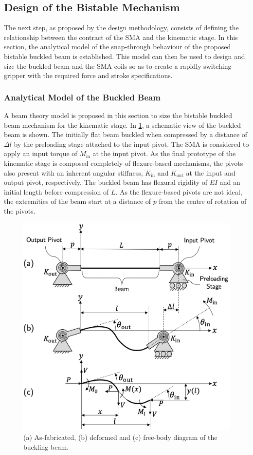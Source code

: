 \subsection{Design of the Bistable Mechanism}
The next step, as proposed by the design methodology, consists of defining the relationship between the contract of the SMA and the kinematic stage. In this section, the analytical model of the snap-through behaviour of the proposed bistable buckled beam is established. This model can then be used to design and size the buckled beam and the SMA coils so as to create a rapidly switching gripper with the required force and stroke specifications.
\subsubsection{Analytical Model of the Buckled Beam}
A beam theory model is proposed in this section to size the bistable buckled beam mechanism for the kinematic stage. In \cref{fig:buckled-beam-schematic}, a schematic view of the buckled beam is shown. The initially flat beam buckled when compressed by a distance of $\Delta l$ by the preloading stage attached to the input pivot. The SMA is considered to apply an input torque of $M_\mathrm{in}$ at the input pivot. As the final prototype of the kinematic stage is composed completely of flexure-based mechanisms, the pivots also present with an inherent angular stiffness, $K_\mathrm{in}$ and $K_\mathrm{out}$ at the input and output pivot, respectively. The buckled beam has  flexural rigidity of $EI$ and an initial length before compression of $L$. As the flexure-based pivots are not ideal, the extremities of the beam start at a distance of $p$ from the centre of rotation of the pivots.
\begin{figure}[hbt!] %
  \centering
  \includegraphics[width=0.7\columnwidth]{images/chap7/buckled_beam_model.png}
  \caption{(a) As-fabricated, (b) deformed and (c) free-body diagram of the buckling beam.}
  \label{fig:buckled-beam-schematic}
\end{figure}

